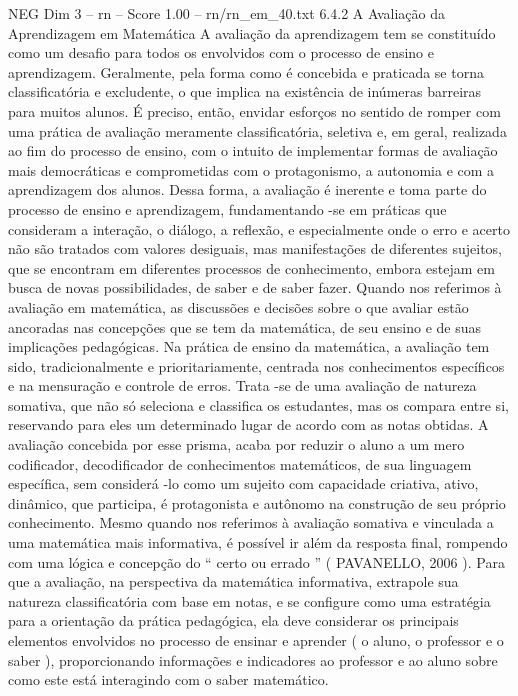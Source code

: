 \begin{textsample}{NEG Dim 3 – rn – Score 1.00 – rn/rn\_em\_40.txt}  \label{ex:f3_neg_195}
6.4.2 A Avaliação da Aprendizagem em Matemática A avaliação da aprendizagem tem se constituído como um desafio para todos os envolvidos com o processo de ensino e aprendizagem.
Geralmente, pela forma como é concebida e praticada se torna classificatória e excludente, o que implica na existência de inúmeras barreiras para muitos alunos.
É preciso, então, envidar esforços no sentido de romper com uma prática de avaliação meramente classificatória, seletiva e, em geral, realizada ao fim do processo de ensino, com o intuito de implementar formas de avaliação mais democráticas e comprometidas com o protagonismo, a autonomia e com a aprendizagem dos alunos.
Dessa forma, a avaliação é inerente e toma parte do processo de ensino e aprendizagem, fundamentando -se em práticas que consideram a interação, o diálogo, a reflexão, e especialmente onde o erro e acerto não são tratados com valores desiguais, mas manifestações de diferentes sujeitos, que se encontram em diferentes processos de conhecimento, embora estejam em busca de novas possibilidades, de saber e de saber fazer.
Quando nos referimos à avaliação em matemática, as discussões e decisões sobre o que avaliar estão ancoradas nas concepções que se tem da matemática, de seu ensino e de suas implicações pedagógicas.
Na prática de ensino da matemática, a avaliação tem sido, tradicionalmente e prioritariamente, centrada nos conhecimentos específicos e na mensuração e controle de erros.
Trata -se de uma avaliação de natureza somativa, que não só seleciona e classifica os estudantes, mas os compara entre si, reservando para eles um determinado lugar de acordo com as notas obtidas.
A avaliação concebida por esse prisma, acaba por reduzir o aluno a um mero codificador, decodificador de conhecimentos matemáticos, de sua linguagem específica, sem considerá -lo como um sujeito com capacidade criativa, ativo, dinâmico, que participa, é protagonista e autônomo na construção de seu próprio conhecimento.
Mesmo quando nos referimos à avaliação somativa e vinculada a uma matemática mais informativa, é possível ir além da resposta final, rompendo com uma lógica e concepção do “ certo ou errado ” ( PAVANELLO, 2006 ).
Para que a avaliação, na perspectiva da matemática informativa, extrapole sua natureza classificatória com base em notas, e se configure como uma estratégia para a orientação da prática pedagógica, ela deve considerar os principais elementos envolvidos no processo de ensinar e aprender ( o aluno, o professor e o saber ), proporcionando informações e indicadores ao professor e ao aluno sobre como este está interagindo com o saber matemático.

\end{textsample}
